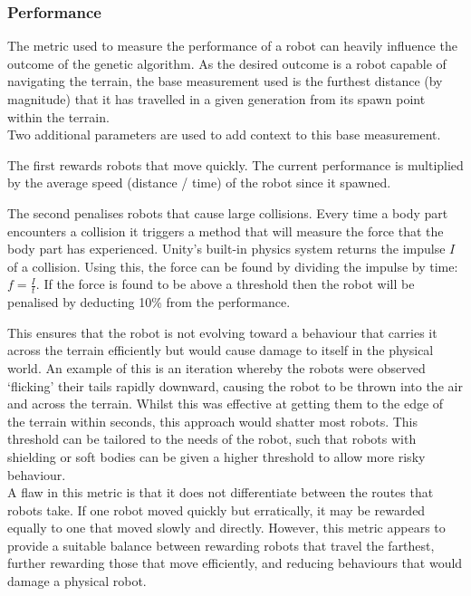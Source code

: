\documentclass{article}
\begin{document}
\subsubsection{Performance}
\label{sec:Performance Imp}
The metric used to measure the performance of a robot can heavily influence the outcome of the genetic algorithm. As the desired outcome is a robot capable of navigating the terrain, the base measurement used is the furthest distance (by magnitude) that it has travelled in a given generation from its spawn point within the terrain. 
\\[1\baselineskip]
Two additional parameters are used to add context to this base measurement. 

The first rewards robots that move quickly. The current performance is multiplied by the average speed (distance / time) of the robot since it spawned.

The second penalises robots that cause large collisions. Every time a body part encounters a collision it triggers a method that will measure the force that the body part has experienced. Unity's built-in physics system returns the impulse $I$ of a collision. Using this, the force can be found by dividing the impulse by time: {\Large $f = \frac{I}{t}$}. 
If the force is found to be above a threshold then the robot will be penalised by deducting 10\% from the performance. 

This ensures that the robot is not evolving toward a behaviour that carries it across the terrain efficiently but would cause damage to itself in the physical world. An example of this is an iteration whereby the robots were observed ‘flicking’ their tails rapidly downward, causing the robot to be thrown into the air and across the terrain. Whilst this was effective at getting them to the edge of the terrain within seconds, this approach would shatter most robots. This threshold can be tailored to the needs of the robot, such that robots with shielding or soft bodies can be given a higher threshold to allow more risky behaviour.\\

A flaw in this metric is that it does not differentiate between the routes that robots take. If one robot moved quickly but erratically, it may be rewarded equally to one that moved slowly and directly. However, this metric appears to provide a suitable balance between rewarding robots that travel the farthest, further rewarding those that move efficiently, and reducing behaviours that would damage a physical robot. \\
\end{document}
